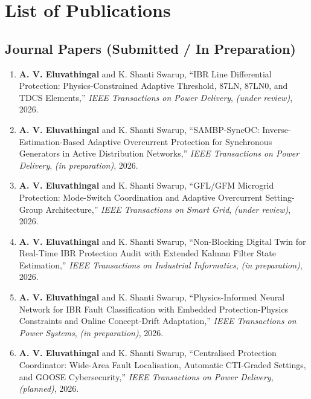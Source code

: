 \chapter*{List of Publications}

\section*{Journal Papers (Submitted / In Preparation)}

\begin{enumerate}

\item \textbf{A. V. Eluvathingal} and K. Shanti Swarup,
  ``IBR Line Differential Protection: Physics-Constrained Adaptive Threshold,
  87LN, 87LN0, and TDCS Elements,''
  \textit{IEEE Transactions on Power Delivery}, \textit{(under review)}, 2026.

\item \textbf{A. V. Eluvathingal} and K. Shanti Swarup,
  ``SAMBP-SyncOC: Inverse-Estimation-Based Adaptive Overcurrent Protection
  for Synchronous Generators in Active Distribution Networks,''
  \textit{IEEE Transactions on Power Delivery}, \textit{(in preparation)}, 2026.

\item \textbf{A. V. Eluvathingal} and K. Shanti Swarup,
  ``GFL/GFM Microgrid Protection: Mode-Switch Coordination and Adaptive
  Overcurrent Setting-Group Architecture,''
  \textit{IEEE Transactions on Smart Grid}, \textit{(under review)}, 2026.

\item \textbf{A. V. Eluvathingal} and K. Shanti Swarup,
  ``Non-Blocking Digital Twin for Real-Time IBR Protection Audit
  with Extended Kalman Filter State Estimation,''
  \textit{IEEE Transactions on Industrial Informatics},
  \textit{(in preparation)}, 2026.

\item \textbf{A. V. Eluvathingal} and K. Shanti Swarup,
  ``Physics-Informed Neural Network for IBR Fault Classification with
  Embedded Protection-Physics Constraints and Online Concept-Drift Adaptation,''
  \textit{IEEE Transactions on Power Systems}, \textit{(in preparation)}, 2026.

\item \textbf{A. V. Eluvathingal} and K. Shanti Swarup,
  ``Centralised Protection Coordinator: Wide-Area Fault Localisation,
  Automatic CTI-Graded Settings, and GOOSE Cybersecurity,''
  \textit{IEEE Transactions on Power Delivery}, \textit{(planned)}, 2026.

\end{enumerate}

